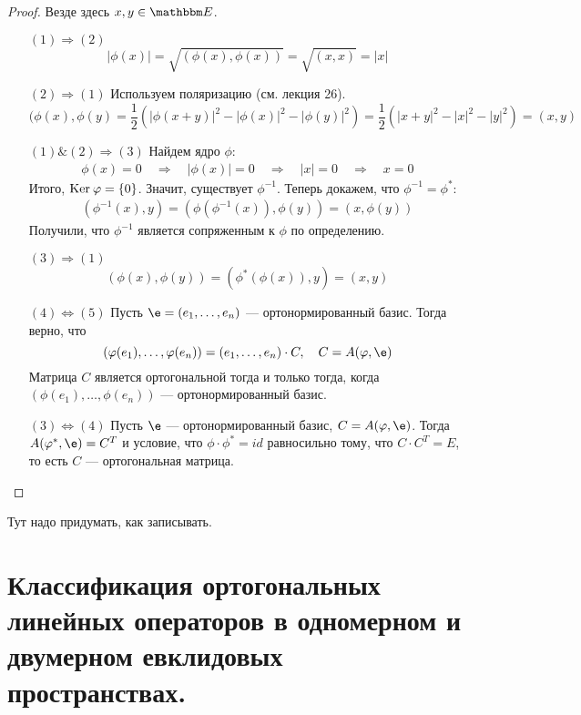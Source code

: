 \begin{proof}
Везде здесь $x, y \in \E$.
\begin{itemize}[align=left]
\item[$(1) \Rightarrow (2)$]
$$
|\phi(x)| = \sqrt{(\phi(x), \phi(x))} = \sqrt{(x, x)} = |x|
$$
\item[$(2) \Rightarrow (1)$] Используем поляризацию (см. лекция 26).
$$
(\phi(x), \phi(y) = \frac{1}{2}(|\phi(x + y)|^2 - |\phi(x)|^2 - |\phi(y)|^2) = \frac{1}{2}(|x + y|^2 - |x|^2 - |y|^2) = (x, y)
$$ 
\item[$(1)\&(2) \Rightarrow (3)$] Найдем ядро $\phi$:
\begin{gather*}
\phi(x) = 0 \quad \Rightarrow \quad |\phi(x)| = 0 \quad \Rightarrow \quad |x| = 0 \quad \Rightarrow \quad x = 0
\end{gather*}
Итого, $\mathrm{Ker}\: \varphi = \{0\}$. Значит, существует $\phi^{-1}$. Теперь докажем, что $\phi^{-1} = \phi^*$:
\begin{gather*}
(\phi^{-1}(x), y) = (\phi(\phi^{-1}(x)), \phi(y)) = (x, \phi(y))
\end{gather*}
Получили, что $\phi^{-1}$ является сопряженным к $\phi$ по определению.
\item[$(3) \Rightarrow (1)$] 
$$
(\phi(x), \phi(y)) = (\phi^*(\phi(x)), y) = (x, y)
$$
\item[$(4) \Leftrightarrow (5)$] Пусть $\e = (e_1, \ldots, e_n)$ --- ортонормированный базис. Тогда верно, что
$$
(\phi(e_1), \ldots, \phi(e_n)) = (e_1, \ldots, e_n) \cdot C, \quad C = A(\phi, \e)
$$
Матрица $C$ является ортогональной тогда и только тогда, когда $(\phi(e_1), \ldots, \phi(e_n))$ --- ортонормированный базис.
\item[$(3) \Leftrightarrow (4)$] Пусть $\e$ --- ортонормированный базис, $C = A(\phi, \e)$. Тогда $A(\phi^*, \e) = C^T$ и условие, что $\phi\cdot\phi^* = id$ равносильно тому, что $C\cdot C^T = E$, то есть $C$ --- ортогональная матрица.
\end{itemize}
\end{proof}

\begin{Examples}
Тут надо придумать, как записывать.
\end{Examples}


\section{Классификация ортогональных линейных операторов в одномерном и двумерном евклидовых пространствах.}

